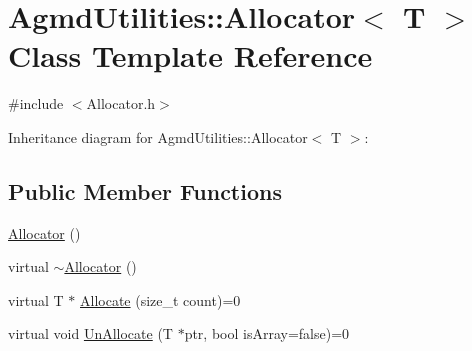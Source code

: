 \hypertarget{class_agmd_utilities_1_1_allocator}{\section{Agmd\+Utilities\+:\+:Allocator$<$ T $>$ Class Template Reference}
\label{class_agmd_utilities_1_1_allocator}
}


{\ttfamily \#include $<$Allocator.\+h$>$}



Inheritance diagram for Agmd\+Utilities\+:\+:Allocator$<$ T $>$\+:
\subsection*{Public Member Functions}
\begin{DoxyCompactItemize}
\item 
\hyperlink{class_agmd_utilities_1_1_allocator_a7dd21216bf412fc979f461b1fcef802f}{Allocator} ()
\item 
virtual \hyperlink{class_agmd_utilities_1_1_allocator_a9f3ebfbeffac208d98f8824160836714}{$\sim$\+Allocator} ()
\item 
virtual T $\ast$ \hyperlink{class_agmd_utilities_1_1_allocator_afc785283cbeeec5ff8c058ff15a96ac4}{Allocate} (size\+\_\+t count)=0
\item 
virtual void \hyperlink{class_agmd_utilities_1_1_allocator_ae48911dc2d192011add15e54eb711a86}{Un\+Allocate} (T $\ast$ptr, bool is\+Array=false)=0
\end{DoxyCompactItemize}


